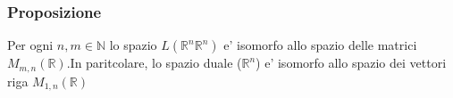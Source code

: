 \documentclass{article}
\begin{document}
\subsubsection{Proposizione}
\begin{flushleft}
	Per ogni $n,m \in \mathbb{N}$ lo spazio $L(\mathbb{R}^n\mathbb{R}^n)$ e' isomorfo allo spazio delle matrici $M_{m,n}(\mathbb{R})$.In paritcolare, lo spazio duale ($\mathbb{R}^n$) e' isomorfo allo spazio dei vettori riga $M_{1,n}(\mathbb{R})$
\end{flushleft}
\end{document}
